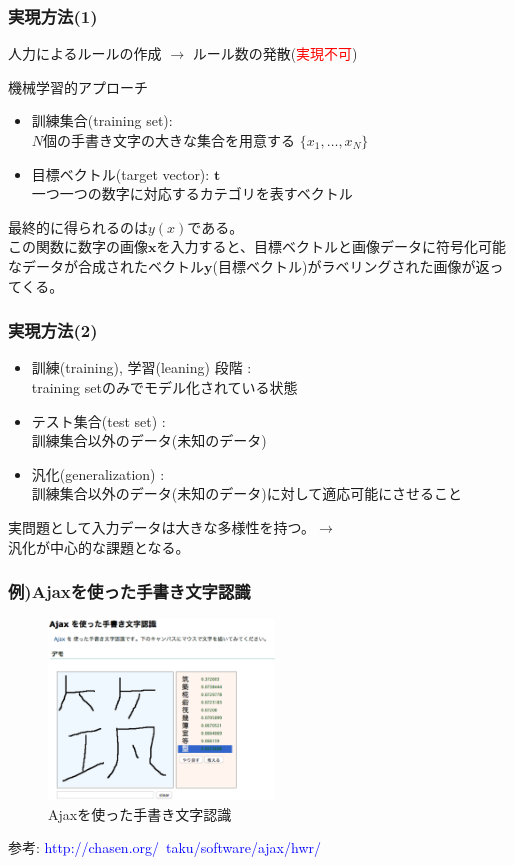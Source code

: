 \documentclass[dvipdfmx]{beamer}
\theoremstyle{definition}
\begin{document}
\begin{frame}
  \frametitle{実現方法(1)}
  人力によるルールの作成 $\to$
  ルール数の発散(\textcolor{red}{実現不可})
  \\
  
  \begin{block}{機械学習的アプローチ}
    \begin{itemize}
      \item 訓練集合(training set):\\$N$個の手書き文字の大きな集合を用意する
      $\{x_1, \ldots , x_N \}$
      \item  目標ベクトル(target vector): $\bm{t}$ \\
      一つ一つの数字に対応するカテゴリを表すベクトル
    \end{itemize}
  \end{block}
  最終的に得られるのは$y(x)$である。\\
  この関数に数字の画像$\bm{x}$を入力すると、目標ベクトルと画像データに符号化可能なデータが合成されたベクトル$\bm{y}$(目標ベクトル)がラベリングされた画像が返ってくる。
\end{frame}

\begin{frame}
  \frametitle{実現方法(2)}
    \begin{itemize}
      \item 訓練(training), 学習(leaning) 段階 : \\ training setのみでモデル化されている状態
      \item テスト集合(test set) : \\ 訓練集合以外のデータ(未知のデータ)
      \item 汎化(generalization) : \\ 訓練集合以外のデータ(未知のデータ)に対して適応可能にさせること
    \end{itemize}
     実問題として入力データは大きな多様性を持つ。$\to$ \\ 汎化が中心的な課題となる。
\end{frame}

\begin{frame}
  \frametitle{例)Ajaxを使った手書き文字認識}
  \begin{figure}[htb]
    \centering
    \includegraphics[width=6.0cm,clip]{res/ajax.eps}
    \caption{Ajaxを使った手書き文字認識}
  \end{figure}
  参考: \textcolor{blue}{http://chasen.org/~taku/software/ajax/hwr/}
\end{frame}
\end{document}

